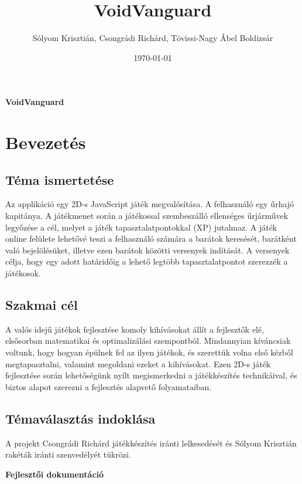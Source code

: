 \documentclass[12pt]{report}
\title{VoidVanguard}
\author{Sólyom Krisztián, Csongrádi Richárd, Tövissi-Nagy Ábel Boldizsár}
\date{\today}
\newcommand{\fullpagetitle}[1]{%
    \clearpage
    \thispagestyle{empty}
    \vspace*{\fill}
    \begin{center}
        {\Huge\bfseries #1\par}
    \end{center}
    \vspace*{\fill}
    \clearpage
    \setcounter{section}{0}
}
\newcommand{\customtoc}{%
    \clearpage
    \thispagestyle{empty}
    \begingroup
        \setlength{\parindent}{0pt}
        \setlength{\leftskip}{0pt}
        \setlength{\cftbeforetoctitleskip}{0pt}
        \setlength{\cftaftertoctitleskip}{0pt}
        \setlength{\cftsecnumwidth}{1.5em}
        \setlength{\cftsubsecnumwidth}{2.5em}
        \setlength{\cftsubsubsecnumwidth}{3.5em}
        \tableofcontents
    \endgroup
    \clearpage
}
\begin{document}
\fullpagetitle{VoidVanguard}

\customtoc

\newpage

\section*{Bevezetés}

\subsection*{Téma ismertetése}
Az applikáció egy 2D-s JavaScript játék megvalósítása. A felhasználó egy űrhajó kapitánya. A játékmenet során a játékossal szembeszálló ellenséges űrjárművek legyőzése a cél, melyet a játék tapasztalatpontokkal (XP) jutalmaz. A játék online felülete lehetővé teszi a felhasználó számára a barátok keresését, barátként való bejelölésüket, illetve ezen barátok közötti versenyek indítását. A versenyek célja, hogy egy adott határidőig a lehető legtöbb tapasztalatpontot szerezzék a játékosok.

\subsection*{Szakmai cél}
A valós idejű játékok fejlesztése komoly kihívásokat állít a fejlesztők elé, elsősorban matematikai és optimalizálási szempontból. Mindannyian kíváncsiak voltunk, hogy hogyan épülnek fel az ilyen játékok, és szerettük volna első kézből megtapasztalni, valamint megoldani ezeket a kihívásokat. Ezen 2D-s játék fejlesztése során lehetőségünk nyílt megismerkedni a játékkészítés technikáival, és biztos alapot szerezni a fejlesztés alapvető folyamataiban.

\subsection*{Témaválasztás indoklása}
A projekt Csongrádi Richárd játékkészítés iránti lelkesedését és Sólyom Krisztián rakéták iránti szenvedélyét tükrözi.

\newpage

\pagestyle{fancy}
\fancyhf{}
\fancyhead[L]{
    \nouppercase{\rightmark}
}
\fancyhead[R]{\thepage}

\fullpagetitle{Fejlesztői dokumentáció}

\end{document}
